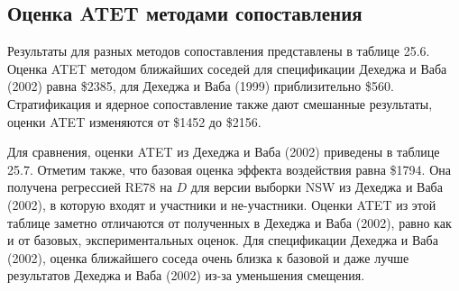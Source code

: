 \subsection*{Оценка ATET методами сопоставления}

Результаты для разных методов сопоставления представлены в таблице 25.6. Оценка ATET методом ближайших соседей для спецификации Дехеджа и Ваба (2002) равна \$2385, для Дехеджа и Ваба (1999) приблизительно \$560. Стратификация и ядерное сопоставление также дают смешанные результаты, оценки ATET изменяются от \$1452 до \$2156. 

Для сравнения, оценки ATET из Дехеджа и Ваба (2002) приведены в таблице 25.7. Отметим также, что базовая оценка эффекта воздействия равна \$1794. Она получена регрессией RE78 на $D$ для версии выборки NSW из Дехеджа и Ваба (2002), в которую входят и участники и не-участники. Оценки ATET из этой таблице заметно отличаются от полученных в Дехеджа и Ваба (2002), равно как и от базовых, экспериментальных оценок. Для спецификации Дехеджа и Ваба (2002), оценка ближайшего соседа очень близка к базовой и даже лучше результатов Дехеджа и Ваба (2002) из-за уменьшения смещения. 

